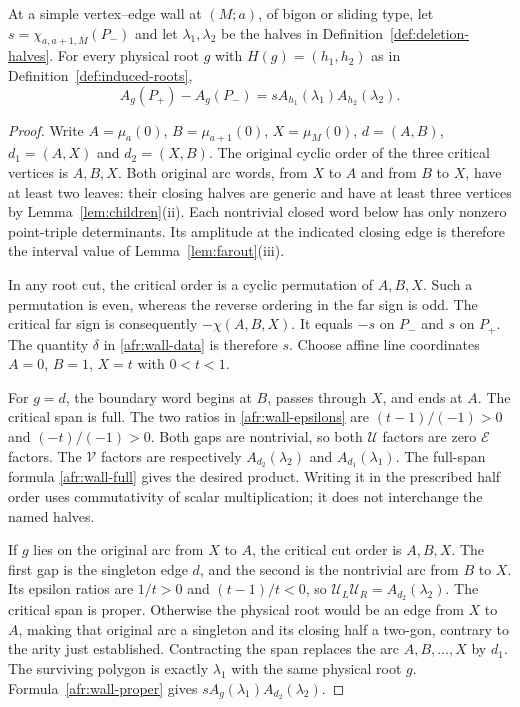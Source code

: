 \begin{theorem}\label{thm:A-S7}
At a simple vertex--edge wall at $(M;a)$, of bigon or sliding type,
let $s=\chi_{a,a+1,M}(P_-)$ and let $\lambda_1,\lambda_2$ be the
halves in Definition~\ref{def:deletion-halves}. For every physical root
$g$ with $H(g)=(h_1,h_2)$ as in Definition~\ref{def:induced-roots},
\begin{equation}\label{as7:law}
A_g(P_+)-A_g(P_-)=s A_{h_1}(\lambda_1)A_{h_2}(\lambda_2).
\end{equation}
\end{theorem}
\begin{proof}
Write $A=\mu_a(0)$, $B=\mu_{a+1}(0)$, $X=\mu_M(0)$,
$d=(A,B)$, $d_1=(A,X)$ and $d_2=(X,B)$. The original cyclic order
of the three critical vertices is $A,B,X$. Both original arc words,
from $X$ to $A$ and from $B$ to $X$, have at least two leaves:
their closing halves are generic and have at least three vertices by
Lemma~\ref{lem:children}(ii). Each nontrivial closed word below has
only nonzero point-triple determinants. Its amplitude at the indicated
closing edge is therefore the interval value of Lemma~\ref{lem:farout}(iii).

In any root cut, the critical order is a cyclic permutation of $A,B,X$.
Such a permutation is even, whereas the reverse ordering in the far
sign is odd. The critical far sign is consequently
$-\chi(A,B,X)$. It equals $-s$ on $P_-$ and $s$ on $P_+$.
The quantity $\delta$ in \eqref{afr:wall-data} is therefore $s$.
Choose affine line coordinates $A=0$, $B=1$, $X=t$ with $0<t<1$.

For $g=d$, the boundary word begins at $B$, passes through $X$,
and ends at $A$. The critical span is full. The two ratios in
\eqref{afr:wall-epsilons} are $(t-1)/(-1)>0$ and $(-t)/(-1)>0$.
Both gaps are nontrivial, so both $\mathcal U$ factors are zero
$\mathcal E$ factors. The $\mathcal V$ factors are respectively
$A_{d_2}(\lambda_2)$ and $A_{d_1}(\lambda_1)$.
The full-span formula \eqref{afr:wall-full} gives the desired product.
Writing it in the prescribed half order uses commutativity of scalar
multiplication; it does not interchange the named halves.

If $g$ lies on the original arc from $X$ to $A$, the critical cut
order is $A,B,X$. The first gap is the singleton edge $d$, and the
second is the nontrivial arc from $B$ to $X$. Its epsilon ratios are
$1/t>0$ and $(t-1)/t<0$, so
$\mathcal U_L\mathcal U_R=A_{d_2}(\lambda_2)$.
The critical span is proper. Otherwise the physical root would be an
edge from $X$ to $A$, making that original arc a singleton and its
closing half a two-gon, contrary to the arity just established.
Contracting the span replaces the arc $A,B,\ldots,X$ by $d_1$.
The surviving polygon is exactly $\lambda_1$ with the same physical
root $g$. Formula~\eqref{afr:wall-proper} gives
$sA_g(\lambda_1)A_{d_2}(\lambda_2)$.


\end{proof}
